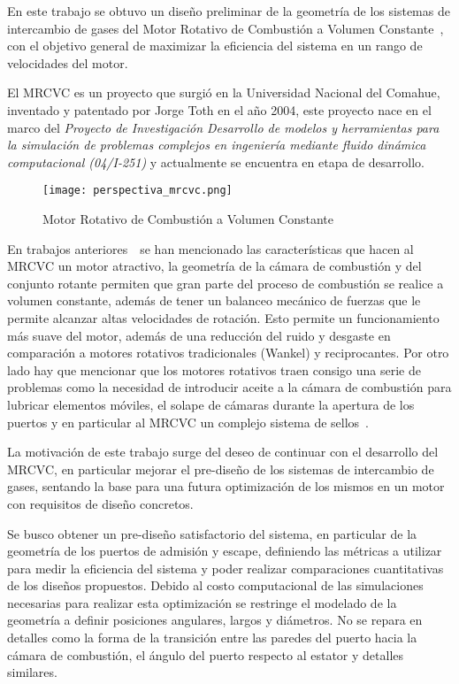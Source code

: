 En este trabajo se obtuvo un diseño preliminar de la geometría de los sistemas
de intercambio de gases del Motor Rotativo de Combustión a Volumen
Constante~\parencite{toth}, con el objetivo general de maximizar la eficiencia
del sistema en un rango de velocidades del motor.
%

El MRCVC es un proyecto que surgió en la Universidad Nacional del Comahue,
inventado y patentado por Jorge Toth en el año 2004, este proyecto nace en el
marco del \emph{Proyecto de Investigación Desarrollo de modelos y herramientas
para la simulación de problemas complejos en ingeniería mediante fluido dinámica
computacional (04/I-251)} y actualmente se encuentra en etapa de desarrollo.

\begin{figure}
    \centering
    \texttt{[image: perspectiva\_mrcvc.png]}
    \caption{Motor Rotativo de Combustión a Volumen Constante}\label{fig:mrcvc}
\end{figure}

En trabajos anteriores~\parencite{lopez16}\parencite{lopez13}~se han mencionado
las características que hacen al MRCVC un motor atractivo, la geometría de la
cámara de combustión y del conjunto rotante permiten que gran parte del proceso
de combustión se realice a volumen constante, además de tener un balanceo
mecánico de fuerzas que le permite alcanzar altas velocidades de rotación.
%
Esto permite un funcionamiento más suave del motor, además de una reducción del
ruido y desgaste en comparación a motores rotativos tradicionales (Wankel) y
reciprocantes.
%
Por otro lado hay que mencionar que los motores rotativos traen consigo una
serie de problemas como la necesidad de introducir aceite a la cámara de
combustión para lubricar elementos móviles, el solape de cámaras durante la
apertura de los puertos y en particular al MRCVC un complejo sistema de
sellos~\parencite{roldan}.


La motivación de este trabajo surge del deseo de continuar con el
desarrollo del MRCVC, en particular mejorar el pre-diseño de los sistemas de
intercambio de gases, sentando la base para una futura optimización de los
mismos en un motor con requisitos de diseño concretos.


Se busco obtener un pre-diseño satisfactorio del sistema, en particular de la
geometría de los puertos de admisión y escape, definiendo las métricas a
utilizar para medir la eficiencia del sistema y poder realizar comparaciones
cuantitativas de los diseños propuestos.
%
%
Debido al costo computacional de las simulaciones necesarias para realizar esta
optimización se restringe el modelado de la geometría a definir posiciones
angulares, largos y diámetros.
%
No se repara en detalles como la forma de la transición entre las paredes del
puerto hacia la cámara de combustión, el ángulo del puerto respecto al estator y
detalles similares.

